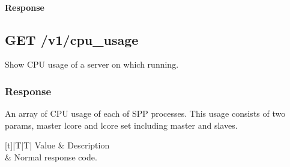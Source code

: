 \documentclass[a4paper,11pt,openany,oneside,english]{sphinxmanual}
\begin{document}
\paragraph{Response}
\label{\detokenize{api_ref/proc_independ:id5}}
\begin{sphinxVerbatim}[commandchars=\\\{\},formatcom=\footnotesize]
\PYG{p}{[}
     \PYG{p}{[}
         
         \PYG{p}{[} \PYG{p}{]}
         
         \PYG{p}{[} \PYG{p}{]}
         
         \PYG{p}{[} \PYG{p}{]}
         
         \PYG{p}{[} \PYG{p}{]}
    \PYG{p}{]}
     
\PYG{p}{]}
\end{sphinxVerbatim}


\subsection{GET /v1/cpu\_usage}
\label{\detokenize{api_ref/proc_independ:get-v1-cpu-usage}}
Show CPU usage of a server on which  running.


\subsubsection{Response}
\label{\detokenize{api_ref/proc_independ:id6}}
An array of CPU usage of each of SPP processes. This usage consists of
two params, master lcore and lcore set including master and slaves.


\begin{savenotes}\sphinxattablestart
\centering
{}
\sphinxthecaptionisattop
{}\label{\detokenize{api_ref/proc_independ:id14}}\label{\detokenize{api_ref/proc_independ:table-spp-ctl-cpu-usage-codes}}
\sphinxaftertopcaption
\begin{tabulary}{\linewidth}[t]{|T|T|}
\hline
\sphinxstyletheadfamily 
Value
&\sphinxstyletheadfamily 
Description
\\
&
Normal response code.
\\
\hline
\end{tabulary}
\par
\sphinxattableend\end{savenotes}
\end{document}
